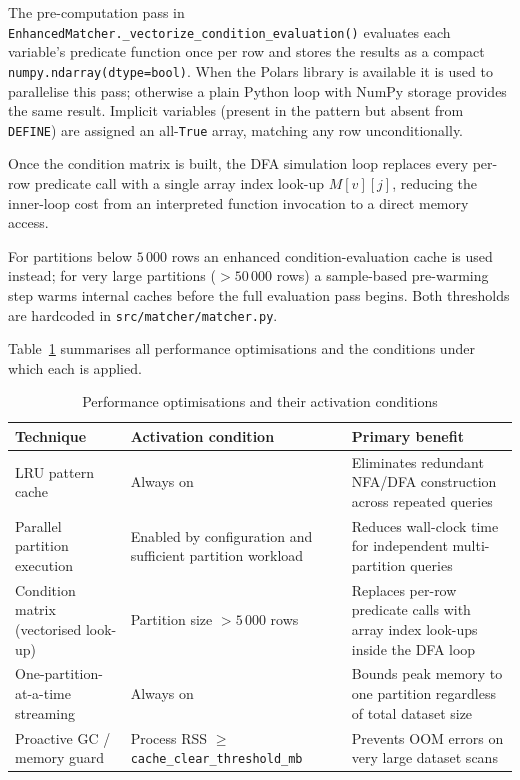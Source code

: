 The pre-computation pass in
\texttt{EnhancedMatcher.\_vectorize\_condition\_evaluation()}
evaluates each variable's predicate function once per row and
stores the results as a compact \texttt{numpy.ndarray(dtype=bool)}.
When the Polars library is available it is used to parallelise this
pass; otherwise a plain Python loop with NumPy storage provides the
same result.  Implicit variables (present in the pattern but absent
from \texttt{DEFINE}) are assigned an all-\texttt{True} array,
matching any row unconditionally.

Once the condition matrix is built, the DFA simulation loop
replaces every per-row predicate call with a single array index
look-up $M[v][j]$, reducing the inner-loop cost from an interpreted
function invocation to a direct memory access.

For partitions below $5\,000$ rows an enhanced
condition-evaluation cache is used instead; for very large
partitions ($>50\,000$ rows) a sample-based pre-warming step
warms internal caches before the full evaluation pass begins.
Both thresholds are hardcoded in
\texttt{src/matcher/matcher.py}.

Table~\ref{tab:perf-summary} summarises all performance
optimisations and the conditions under which each is applied.

\begin{table}[htbp]
  \centering
  \caption{Performance optimisations and their activation
    conditions}
  \label{tab:perf-summary}
  \begin{tabular}{p{3.8cm}p{4.2cm}p{4.4cm}}
    \toprule
    \textbf{Technique} & \textbf{Activation condition}
      & \textbf{Primary benefit} \\
    \midrule
    LRU pattern cache
      & Always on
      & Eliminates redundant NFA/DFA construction across repeated
        queries \\[4pt]
    Parallel partition execution
      & Enabled by configuration and sufficient partition workload
      & Reduces wall-clock time for independent multi-partition
        queries \\[4pt]
    Condition matrix (vectorised look-up)
      & Partition size $> 5\,000$ rows
      & Replaces per-row predicate calls with array index
        look-ups inside the DFA loop \\[4pt]
    One-partition-at-a-time streaming
      & Always on
      & Bounds peak memory to one partition regardless of total
        dataset size \\[4pt]
    Proactive GC / memory guard
      & Process RSS $\geq$ \texttt{cache\_clear\_threshold\_mb}
      & Prevents OOM errors on very large dataset scans \\
    \bottomrule
  \end{tabular}
\end{table}

